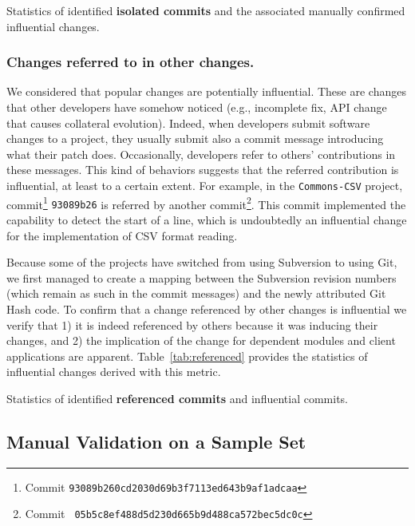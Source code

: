 \begin{table}[!h]
\centering
\caption{Statistics of identified {\bf isolated commits} and the associated manually confirmed influential changes.}

\label{tab:isolated}
\end{table}


\subsubsection{Changes referred to in other changes.}
We considered that popular changes are potentially influential.
These are changes that other developers have somehow noticed (e.g., incomplete fix,
API change that causes collateral evolution). Indeed,
when developers submit software changes to a project, they usually submit
also a commit message introducing what their patch does. Occasionally,
developers refer to others' contributions in these messages. This kind of
behaviors suggests that the referred contribution is influential, at
least to a certain extent. For example, in the {\tt Commons-CSV} project, 
commit\footnote{Commit \tt\small 93089b260cd2030d69b3f7113ed643b9af1adcaa} 
{\tt 93089b26} is referred by another commit\footnote{Commit \tt\small
05b5c8ef488d5d230d665b9d488ca572bec5dc0c}.
This commit implemented the capability to detect the start of a line, 
which is undoubtedly an influential change for the implementation of CSV format reading.

Because some of the projects have switched from
using Subversion to using Git, we first managed to create a mapping between
the Subversion revision numbers (which remain as such in the commit messages) and
the newly attributed Git Hash code. 
To confirm that a change referenced by other changes is influential we verify that 1) it is indeed referenced by 
others because it was inducing their changes, and 2) the implication of the change for dependent modules and client applications
are apparent. Table~\ref{tab:referenced} provides the
statistics of influential changes derived with this metric.


\begin{table}[h!]
\centering
\caption{Statistics of identified {\bf referenced commits} and influential commits.}

\label{tab:referenced}
\end{table}


\subsection{Manual Validation on a Sample Set}

